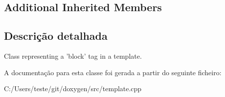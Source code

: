 \subsection*{Additional Inherited Members}


\subsection{Descrição detalhada}
Class representing a 'block' tag in a template. 

A documentação para esta classe foi gerada a partir do seguinte ficheiro\-:\begin{DoxyCompactItemize}
\item 
C\-:/\-Users/teste/git/doxygen/src/template.\-cpp\end{DoxyCompactItemize}
